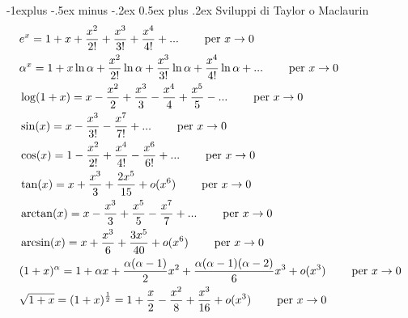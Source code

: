 \documentclass[a4paper,10pt,landscape]{article}
\makeatletter
\renewcommand{\subsection}{\@startsection{subsection}{2}{0mm}%
                                {-1explus -.5ex minus -.2ex}%
                                {0.5ex plus .2ex}%
                                {\normalfont\normalsize\bfseries}}
\makeatother
\begin{document}
\begin{multicols}{3}
\subsection{Sviluppi di Taylor o Maclaurin}
\begin{align*}
    & e^x = 1 + x + \frac{x^2}{2!} + \frac{x^3}{3!} + \frac{x^4}{4!} + ... \hspace{8mm} \mbox{per } x \rightarrow 0 \\
    & \alpha^x = 1 + x \ln \alpha + \frac{x^2}{2!} \ln \alpha + \frac{x^3}{3!} \ln \alpha + \frac{x^4}{4!} \ln \alpha + ... \hspace{8mm} \mbox{per } x \rightarrow 0 \\
    & \log(1 + x) = x - \frac{x^2}{2} + \frac{x^3}{3} - \frac{x^4}{4} + \frac{x^5}{5} - ... \hspace{8mm} \mbox{per } x \rightarrow 0 \\
    & \sin(x) = x - \frac{x^3}{3!} - \frac{x^7}{7!} + ... \hspace{8mm} \mbox{per } x \rightarrow 0 \\
    & \cos(x) = 1 - \frac{x^2}{2!} + \frac{x^4}{4!} - \frac{x^6}{6!} + ... \hspace{8mm} \mbox{per } x \rightarrow 0 \\
    & \tan(x) = x + \frac{x^3}{3} + \frac{2x^5}{15} + o(x^6) \hspace{8mm} \mbox{per } x \rightarrow 0 \\
    & \arctan(x) = x - \frac{x^3}{3} + \frac{x^5}{5} - \frac{x^7}{7} + ...  \hspace{8mm} \mbox{per } x \rightarrow 0 \\
    & \arcsin(x) = x + \frac{x^3}{6} + \frac{3x^5}{40} + o(x^6)  \hspace{8mm} \mbox{per } x \rightarrow 0 \\
    & (1 + x)^{\alpha} = 1 + \alpha x + \frac{\alpha (\alpha - 1)}{2}x^2 + \frac{\alpha (\alpha - 1)(\alpha - 2)}{6}x^3 + o(x^3) \hspace{8mm} \mbox{per } x \rightarrow 0 \\
    & \sqrt{1 + x} = (1+x)^{\frac{1}{2}} = 1 + \frac{x}{2} - \frac{x^2}{8} + \frac{x^3}{16} + o(x^3)  \hspace{8mm} \mbox{per } x \rightarrow 0 \\
\end{align*}


 

\end{multicols}
\end{document}
